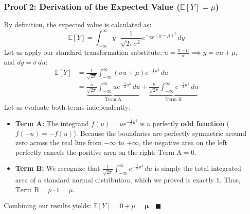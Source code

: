 \documentclass{article}
\begin{document}
\subsubsection*{Proof 2: Derivation of the Expected Value ($\mathbb{E}[Y] = \mu$)}
By definition, the expected value is calculated as:
\begin{equation}
    \mathbb{E}[Y] = \int_{-\infty}^{\infty} y \cdot \frac{1}{\sqrt{2\pi\sigma^2}} e^{-\frac{1}{2\sigma^2}(y-\mu)^2} \, dy
\end{equation}
Let us apply our standard transformation substitute: $u = \frac{y-\mu}{\sigma} \implies y = \sigma u + \mu$, and $dy = \sigma \, du$:
\begin{align*}
    \mathbb{E}[Y] &= \frac{1}{\sqrt{2\pi}} \int_{-\infty}^{\infty} (\sigma u + \mu) e^{-\frac{1}{2}u^2} \, du \\
    &= \underbrace{\frac{\sigma}{\sqrt{2\pi}} \int_{-\infty}^{\infty} u e^{-\frac{1}{2}u^2} \, du}_{\text{Term A}} + \underbrace{\frac{\mu}{\sqrt{2\pi}} \int_{-\infty}^{\infty} e^{-\frac{1}{2}u^2} \, du}_{\text{Term B}}
\end{align*}
Let us evaluate both terms independently:
\begin{itemize}
    \item \textbf{Term A:} The integrand $f(u) = u e^{-\frac{1}{2}u^2}$ is a perfectly \textbf{odd function} ($f(-u) = -f(u)$). Because the boundaries are perfectly symmetric around zero across the real line from $-\infty$ to $+\infty$, the negative area on the left perfectly cancels the positive area on the right: $\text{Term A} = 0$.
    \item \textbf{Term B:} We recognize that $\frac{1}{\sqrt{2\pi}} \int_{-\infty}^{\infty} e^{-\frac{1}{2}u^2} \, du$ is simply the total integrated area of a standard normal distribution, which we proved is exactly $1$. Thus, $\text{Term B} = \mu \cdot 1 = \mu$.
\end{itemize}
Combining our results yields: $\mathbb{E}[Y] = 0 + \mu = \mathbf{\mu} \quad \blacksquare$
\end{document}
